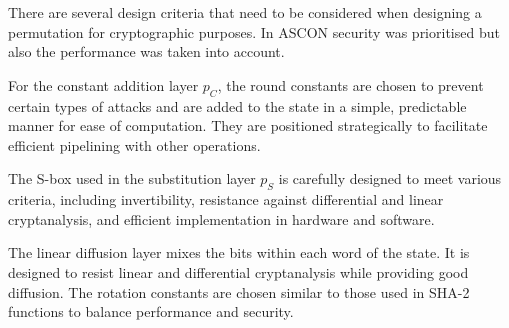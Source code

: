 \documentclass{article}
\begin{document}
There are several design criteria that need to be considered when designing a permutation for cryptographic purposes. In ASCON security was prioritised but also the performance was taken into account. \par

For the constant addition layer $p_C$, the round constants are chosen to prevent certain types of attacks and are added to the state in a simple, predictable manner for ease of computation. They are positioned strategically to facilitate efficient pipelining with other operations. \par

The S-box used in the substitution layer $p_S$ is carefully designed to meet various criteria, including invertibility, resistance against differential and linear cryptanalysis, and efficient implementation in hardware and software. \par

The linear diffusion layer mixes the bits within each word of the state. It is designed to resist linear and differential cryptanalysis while providing good diffusion. The rotation constants are chosen similar to those used in SHA-2 functions to balance performance and security. \par

\cite{DBLP:journals/joc/DobraunigEMS21}

\printbibliography
\end{document}
